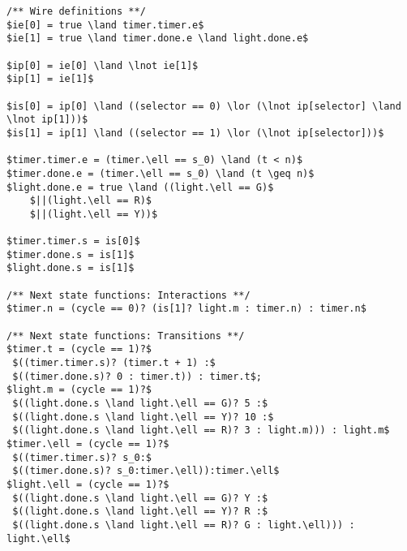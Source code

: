 \begin{lstlisting}[caption=Sample of \biptool{} generated code,label=sample:code:bip,float=bt]
/** Wire definitions **/
$ie[0] = true \land timer.timer.e$
$ie[1] = true \land timer.done.e \land light.done.e$

$ip[0] = ie[0] \land \lnot ie[1]$
$ip[1] = ie[1]$

$is[0] = ip[0] \land ((selector == 0) \lor (\lnot ip[selector] \land \lnot ip[1]))$
$is[1] = ip[1] \land ((selector == 1) \lor (\lnot ip[selector]))$

$timer.timer.e = (timer.\ell == s_0) \land (t < n)$
$timer.done.e = (timer.\ell == s_0) \land (t \geq n)$
$light.done.e = true \land ((light.\ell == G)$ 
    $||(light.\ell == R)$
    $||(light.\ell == Y))$
    
$timer.timer.s = is[0]$
$timer.done.s = is[1]$
$light.done.s = is[1]$

/** Next state functions: Interactions **/
$timer.n = (cycle == 0)? (is[1]? light.m : timer.n) : timer.n$

/** Next state functions: Transitions **/
$timer.t = (cycle == 1)?$ 
 $((timer.timer.s)? (timer.t + 1) :$
 $((timer.done.s)? 0 : timer.t)) : timer.t$;
$light.m = (cycle == 1)?$
 $((light.done.s \land light.\ell == G)? 5 :$
 $((light.done.s \land light.\ell == Y)? 10 :$
 $((light.done.s \land light.\ell == R)? 3 : light.m))) : light.m$
$timer.\ell = (cycle == 1)?$
 $((timer.timer.s)? s_0:$
 $((timer.done.s)? s_0:timer.\ell)):timer.\ell$
$light.\ell = (cycle == 1)?$
 $((light.done.s \land light.\ell == G)? Y :$
 $((light.done.s \land light.\ell == Y)? R :$
 $((light.done.s \land light.\ell == R)? G : light.\ell))) : light.\ell$
\end{lstlisting}
%
